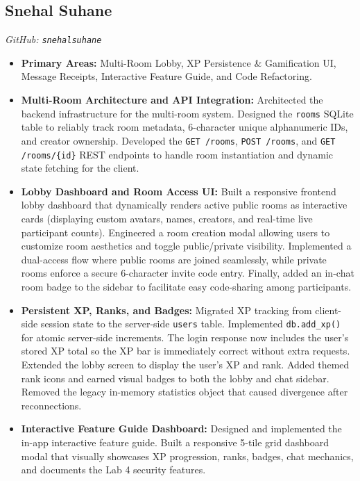 \documentclass[12pt, a4paper]{article}
\begin{document}
\subsection{Snehal Suhane}
\textit{GitHub: \texttt{snehalsuhane}}
\begin{itemize}[leftmargin=*]
\item\textbf{Primary Areas:} Multi-Room Lobby, XP Persistence \& Gamification UI, Message Receipts, Interactive Feature Guide, and Code Refactoring.

\item \textbf{Multi-Room Architecture and API Integration:} Architected the backend infrastructure for the multi-room system. Designed the \texttt{rooms} SQLite table to reliably track room metadata, 6-character unique alphanumeric IDs, and creator ownership. Developed the \texttt{GET /rooms}, \texttt{POST /rooms}, and \texttt{GET /rooms/\{id\}} REST endpoints to handle room instantiation and dynamic state fetching for the client.

    \item \textbf{Lobby Dashboard and Room Access UI:} Built a responsive frontend lobby dashboard that dynamically renders active public rooms as interactive cards (displaying custom avatars, names, creators, and real-time live participant counts). Engineered a room creation modal allowing users to customize room aesthetics and toggle public/private visibility. Implemented a dual-access flow where public rooms are joined seamlessly, while private rooms enforce a secure 6-character invite code entry. Finally, added an in-chat room badge to the sidebar to facilitate easy code-sharing among participants.

    \item \textbf{Persistent XP, Ranks, and Badges:} Migrated XP tracking from client-side session state to the server-side \texttt{users} table. Implemented \texttt{db.add\_xp()} for atomic server-side increments. The login response now includes the user's stored XP total so the XP bar is immediately correct without extra requests. Extended the lobby screen to display the user's XP and rank. Added themed rank icons and earned visual badges to both the lobby and chat sidebar. Removed the legacy in-memory statistics object that caused divergence after reconnections.

    \item \textbf{Interactive Feature Guide Dashboard:} Designed and implemented the in-app interactive feature guide. Built a responsive 5-tile grid dashboard modal that visually showcases XP progression, ranks, badges, chat mechanics, and documents the Lab 4 security features.


\end{itemize}
\end{document}
